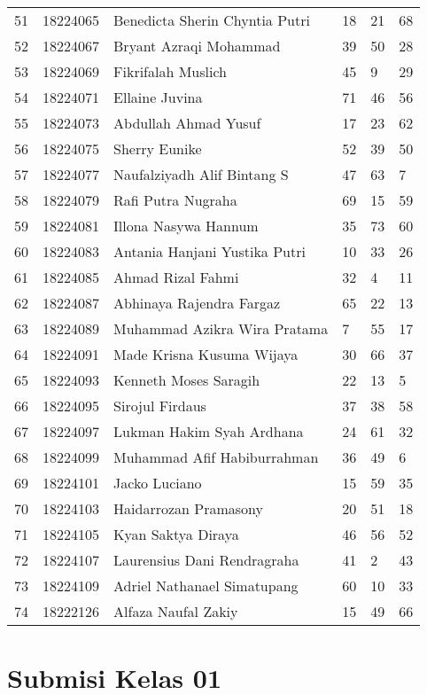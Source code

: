 \documentclass[
  letterpaper,
  DIV=11,
  numbers=noendperiod]{scrreprt}
\begin{document}
\begin{longtable}[]{@{}llllll@{}}
51 & 18224065 & Benedicta Sherin Chyntia Putri & 18 & 21 & 68 \\
52 & 18224067 & Bryant Azraqi Mohammad & 39 & 50 & 28 \\
53 & 18224069 & Fikrifalah Muslich & 45 & 9 & 29 \\
54 & 18224071 & Ellaine Juvina & 71 & 46 & 56 \\
55 & 18224073 & Abdullah Ahmad Yusuf & 17 & 23 & 62 \\
56 & 18224075 & Sherry Eunike & 52 & 39 & 50 \\
57 & 18224077 & Naufalziyadh Alif Bintang S & 47 & 63 & 7 \\
58 & 18224079 & Rafi Putra Nugraha & 69 & 15 & 59 \\
59 & 18224081 & Illona Nasywa Hannum & 35 & 73 & 60 \\
60 & 18224083 & Antania Hanjani Yustika Putri & 10 & 33 & 26 \\
61 & 18224085 & Ahmad Rizal Fahmi & 32 & 4 & 11 \\
62 & 18224087 & Abhinaya Rajendra Fargaz & 65 & 22 & 13 \\
63 & 18224089 & Muhammad Azikra Wira Pratama & 7 & 55 & 17 \\
64 & 18224091 & Made Krisna Kusuma Wijaya & 30 & 66 & 37 \\
65 & 18224093 & Kenneth Moses Saragih & 22 & 13 & 5 \\
66 & 18224095 & Sirojul Firdaus & 37 & 38 & 58 \\
67 & 18224097 & Lukman Hakim Syah Ardhana & 24 & 61 & 32 \\
68 & 18224099 & Muhammad Afif Habiburrahman & 36 & 49 & 6 \\
69 & 18224101 & Jacko Luciano & 15 & 59 & 35 \\
70 & 18224103 & Haidarrozan Pramasony & 20 & 51 & 18 \\
71 & 18224105 & Kyan Saktya Diraya & 46 & 56 & 52 \\
72 & 18224107 & Laurensius Dani Rendragraha & 41 & 2 & 43 \\
73 & 18224109 & Adriel Nathanael Simatupang & 60 & 10 & 33 \\
74 & 18222126 & Alfaza Naufal Zakiy & 15 & 49 & 66 \\
\end{longtable}

\section{Submisi Kelas 01}\label{submisi-kelas-01}
\end{document}
